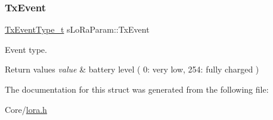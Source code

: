 \subsubsection{\texorpdfstring{Tx\+Event}{TxEvent}}
{\footnotesize\ttfamily \hyperlink{lora_8h_ad214b606ffdf2be60abb61bcebbbc83e}{Tx\+Event\+Type\+\_\+t} s\+Lo\+Ra\+Param\+::\+Tx\+Event}



Event type. 


\begin{DoxyRetVals}{Return values}
{\em value} & battery level ( 0\+: very low, 254\+: fully charged ) \\
\hline
\end{DoxyRetVals}


The documentation for this struct was generated from the following file\+:\begin{DoxyCompactItemize}
\item 
Core/\hyperlink{lora_8h}{lora.\+h}\end{DoxyCompactItemize}

